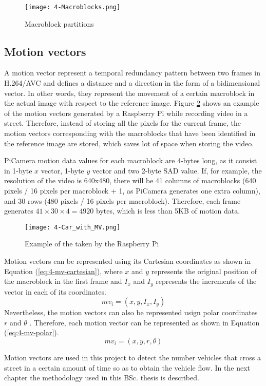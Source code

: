 \begin{figure}[!h]
	\begin{center}
		\texttt{[image: 4-Macroblocks.png]}
		\caption{Macroblock partitions}
		\label{fig:4-Macroblocks}
	\end{center}
\end{figure}


\subsection{Motion vectors}
A motion vector represent a temporal redundancy pattern between two frames in H.264/AVC and defines a distance and a direction in the form of a bidimensional vector. In other words, they represent the movement of a certain macroblock in the actual image with respect to the reference image. Figure \ref{fig:4-Car_with_MV} shows an example of the motion vectors generated by a Raspberry Pi while recording video in a street. Therefore, instead of storing all the pixels for the current frame, the motion vectors corresponding with the macroblocks that have been identified in the reference image are stored, which saves lot of space when storing the video.

PiCamera motion data values for each macroblock are 4-bytes long, as it consist in 1-byte $x$ vector, 1-byte $y$ vector and two 2-byte \ac{SAD} value. If, for example, the resolution of the video is 640x480, there will be 41 columns of macroblocks (640 pixels / 16 pixels per macroblock + 1, as PiCamera generates one extra column), and 30 rows (480 pixels / 16 pixels per macroblock). Therefore, each frame generates $41\times30\times4 = 4920$ bytes, which is less than 5KB of motion data.

\begin{figure}[!h]
	\begin{center}
		\texttt{[image: 4-Car\_with\_MV.png]}
		\caption{Example of  the  taken by the Raspberry Pi}
		\label{fig:4-Car_with_MV}
	\end{center}
\end{figure}

Motion vectors can be represented using its Cartesian coordinates as shown in Equation (\ref{eq:4-mv-cartesian}), where $x$ and $y$ represents the original position of the macroblock in the first frame and $I_{x}$ and $I_{y}$ represents the increments of the vector in each of its coordinates.
\begin{equation} \label{eq:4-mv-cartesian}
mv_{i} = (x, y, I_{x}, I_{y})
\end{equation}
Nevertheless, the motion vectors can also be represented usign polar coordinates $r$ and $\theta$ \cite{GRMSJ12}. Therefore, each motion vector can be represented as shown in Equation (\ref{eq:4-mv-polar}).
\begin{equation} \label{eq:4-mv-polar}
mv_{i} = (x, y, r, \theta)
\end{equation}

Motion vectors are used in this project to detect the number vehicles that cross a street in a certain amount of time so as to obtain the vehicle flow. In the next chapter the methodology used in this \ac{BSc.} thesis is described.



